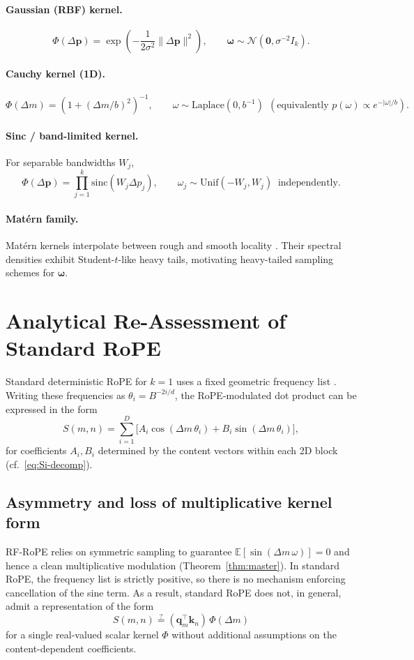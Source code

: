 \documentclass{article}
\theoremstyle{plain}
\theoremstyle{remark}
\begin{document}
\paragraph{Gaussian (RBF) kernel.}
\[
\Phi(\Delta\mathbf{p})=\exp\!\left(-\frac{1}{2\sigma^2}\|\Delta\mathbf{p}\|^2\right),
\qquad
\boldsymbol{\omega}\sim \mathcal{N}(\mathbf{0},\sigma^{-2}I_k).
\]

\paragraph{Cauchy kernel (1D).}
\[
\Phi(\Delta m)=\left(1+(\Delta m/b)^2\right)^{-1},
\qquad
\omega \sim \mathrm{Laplace}(0,b^{-1})\ \ (\text{equivalently }p(\omega)\propto e^{-|\omega|/b}).
\]

\paragraph{Sinc / band-limited kernel.}
For separable bandwidths $W_j$,
\[
\Phi(\Delta\mathbf{p})=\prod_{j=1}^{k}\mathrm{sinc}(W_j\Delta p_j),
\qquad
\omega_j \sim \mathrm{Unif}(-W_j,W_j)\ \text{ independently.}
\]

\paragraph{Mat\'ern family.}
Mat\'ern kernels interpolate between rough and smooth locality \cite{matern1960spatial,rasmussen2006gpml}. Their spectral densities exhibit Student-$t$-like heavy tails, motivating heavy-tailed sampling schemes for $\boldsymbol{\omega}$.

\section{Analytical Re-Assessment of Standard RoPE}
Standard deterministic RoPE for $k=1$ uses a fixed geometric frequency list \cite{su2021roformer}. Writing these frequencies as $\theta_i=B^{-2i/d}$, the RoPE-modulated dot product can be expressed in the form
\[
S(m,n)=\sum_{i=1}^{D}\Big[A_i\cos(\Delta m\,\theta_i)+B_i\sin(\Delta m\,\theta_i)\Big],
\]
for coefficients $A_i,B_i$ determined by the content vectors within each 2D block (cf.\ \eqref{eq:Si-decomp}).

\subsection{Asymmetry and loss of multiplicative kernel form}
RF-RoPE relies on symmetric sampling to guarantee $\mathbb{E}[\sin(\Delta m\,\omega)]=0$ and hence a clean multiplicative modulation (Theorem~\ref{thm:master}). In standard RoPE, the frequency list is strictly positive, so there is no mechanism enforcing cancellation of the sine term. As a result, standard RoPE does not, in general, admit a representation of the form
\[
S(m,n)\stackrel{?}{=}(\mathbf{q}_m^\top\mathbf{k}_n)\,\Phi(\Delta m)
\]
for a single real-valued scalar kernel $\Phi$ without additional assumptions on the content-dependent coefficients.
\end{document}
